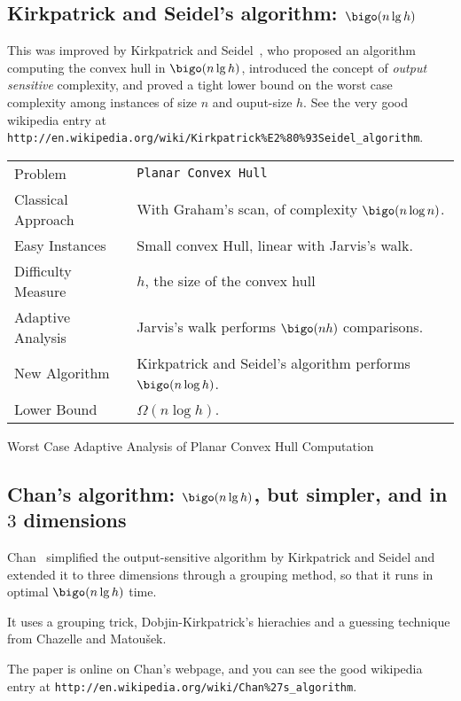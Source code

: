 \subsection{Kirkpatrick and Seidel's algorithm: $\bigo(n\lg h)$}
\label{sec:kirkp-seid-algor}


This was improved by Kirkpatrick and Seidel~\cite{kirkpatrick}, who
proposed an algorithm computing the convex hull in $\bigo(n\lg h)$,
introduced the concept of {\em output sensitive} complexity, and
proved a tight lower bound on the worst case complexity among
instances of size $n$ and ouput-size $h$.
%
See the very good wikipedia entry at
\verb+http://en.wikipedia.org/wiki/Kirkpatrick%E2%80%93Seidel_algorithm+.


\begin{adaptiveanalysis}[e]
  \begin{tabular}{@{\bf}p{}p{}}
    Problem            & {\tt Planar Convex Hull}\\               
    Classical Approach & With Graham's scan, of complexity $\bigo(n\log n)$. \\
    Easy Instances     & Small convex Hull, linear with Jarvis's walk.\\
    Difficulty Measure & $h$, the size of the convex hull\\
    Adaptive Analysis  & Jarvis's walk  performs $\bigo(nh)$ comparisons. \\
    New Algorithm      & Kirkpatrick and Seidel's algorithm  performs $\bigo(n\log h)$. \\
    Lower Bound        & $\Omega( n \log h)$. \\
  \end{tabular}
  \caption{Worst Case Adaptive Analysis of Planar Convex Hull
    Computation}
  \label{tab:planarConvexHull}
\end{adaptiveanalysis}

\subsection{Chan's algorithm: $\bigo(n\lg h)$, but simpler, and in $3$ dimensions}
\label{sec:chans-algor-:big}


Chan~\cite{optimalOutputSensitiveConvexHullAlgorithmsInTwoAndThreeDimensions}
simplified the output-sensitive algorithm by Kirkpatrick and Seidel
and extended it to three dimensions through a grouping method, so that
it runs in optimal $\bigo(n\lg h)$ time.
%
\begin{LONG}
  It uses a grouping trick, Dobjin-Kirkpatrick's hierachies and a
  guessing technique from Chazelle and Matou\v{s}ek.
\end{LONG}
%
The paper is online on Chan's webpage, and you can see the good
wikipedia entry at
\verb+http://en.wikipedia.org/wiki/Chan%27s_algorithm+.


